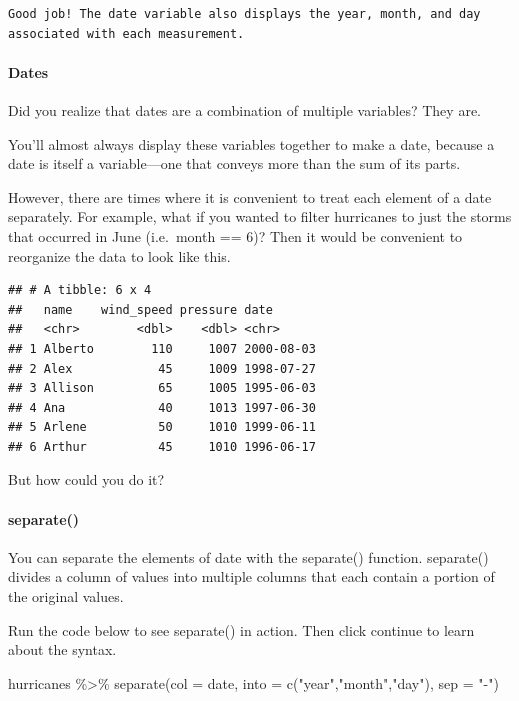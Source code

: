 \documentclass[
]{article}
\newenvironment{Shaded}{\begin{snugshade}}{\end{snugshade}}
\newcommand{\AttributeTok}[1]{\textcolor[rgb]{0.77,0.63,0.00}{#1}}
\newcommand{\FunctionTok}[1]{\textcolor[rgb]{0.00,0.00,0.00}{#1}}
\newcommand{\NormalTok}[1]{#1}
\newcommand{\SpecialCharTok}[1]{\textcolor[rgb]{0.00,0.00,0.00}{#1}}
\newcommand{\StringTok}[1]{\textcolor[rgb]{0.31,0.60,0.02}{#1}}
\begin{document}
\begin{verbatim}
Good job! The date variable also displays the year, month, and day associated with each measurement.
\end{verbatim}

\hypertarget{dates}{%
\paragraph{Dates}\label{dates}}

Did you realize that dates are a combination of multiple variables? They
are.

You'll almost always display these variables together to make a date,
because a date is itself a variable---one that conveys more than the sum
of its parts.

However, there are times where it is convenient to treat each element of
a date separately. For example, what if you wanted to filter hurricanes
to just the storms that occurred in June (i.e.~month == 6)? Then it
would be convenient to reorganize the data to look like this.

\begin{verbatim}
## # A tibble: 6 x 4
##   name    wind_speed pressure date      
##   <chr>        <dbl>    <dbl> <chr>     
## 1 Alberto        110     1007 2000-08-03
## 2 Alex            45     1009 1998-07-27
## 3 Allison         65     1005 1995-06-03
## 4 Ana             40     1013 1997-06-30
## 5 Arlene          50     1010 1999-06-11
## 6 Arthur          45     1010 1996-06-17
\end{verbatim}

But how could you do it?

\hypertarget{separate-1}{%
\paragraph{separate()}\label{separate-1}}

You can separate the elements of date with the separate() function.
separate() divides a column of values into multiple columns that each
contain a portion of the original values.

Run the code below to see separate() in action. Then click continue to
learn about the syntax.

\begin{Shaded}
\begin{Highlighting}[]
\NormalTok{hurricanes }\SpecialCharTok{\%\textgreater{}\%} 
  \FunctionTok{separate}\NormalTok{(}\AttributeTok{col =}\NormalTok{ date, }\AttributeTok{into =} \FunctionTok{c}\NormalTok{(}\StringTok{"year"}\NormalTok{,}\StringTok{"month"}\NormalTok{,}\StringTok{"day"}\NormalTok{), }\AttributeTok{sep =} \StringTok{"{-}"}\NormalTok{)}
\end{Highlighting}
\end{Shaded}
\end{document}
